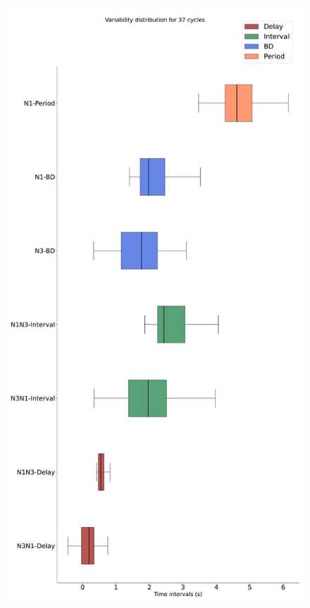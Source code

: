 \begin{figure}[htbp]
\begin{minipage}{0.9\textwidth}
\begin{minipage}[b]{0.43\textwidth}
			\includegraphics[width=\textwidth]{./invariants/data/SUSSEX/CV1a_driven3/images/stim_cv1a3_boxplot.pdf}
		\end{minipage}
		\begin{minipage}[b]{0.55\textwidth}

\end{minipage}
\end{minipage}
\end{figure}
